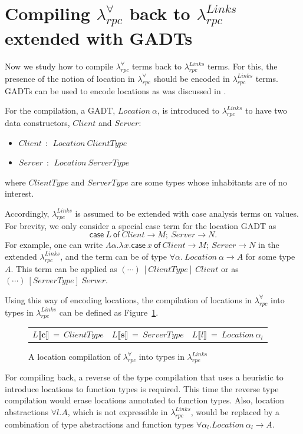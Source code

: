 \documentclass[a4paper]{article}
\theoremstyle{plain}
\theoremstyle{definition}
\newcommand{\polyrpc}{$\lambda_{rpc}^{\forall}$\xspace}
\newcommand{\linksrpc}{$\lambda_{rpc}^{Links}$\xspace}
\newcommand{\client}{\textbf{c}}
\newcommand{\server}{\textbf{s}}
\newcommand{\lamL}[3]{\lambda^{#1}#2.#3}
\newcommand{\textsfCase}{\textsf{case}}
\newcommand{\textsfOf}{\textsf{of}}
\newcommand{\case}[2]{\textsfCase ~ #1 ~\textsfOf ~ #2}
\newcommand{\loctycomp}[1]{L\llbracket#1\rrbracket}
\begin{document}
\section{Compiling {\polyrpc} back to {\linksrpc} extended with GADTs}
\label{sec:compilationwithgadts}


%
Now we study how to compile \polyrpc terms back to \linksrpc terms.
%
For this, the presence of the notion of location in \polyrpc should be
encoded in \linksrpc terms.
%
GADTs can be used to encode locations as was discussed in
\cite{CHOI:scp2020}.

%
For the compilation, a GADT, $Location \ \alpha$, is introduced to
\linksrpc to have two data constructors, $Client $ and $Server$:
\begin{itemize}
  \item $Client \ \ : \ \ Location \ ClientType$
  \item $Server \ \ : \ \ Location \ ServerType$
\end{itemize}
where $ClientType$ and $ServerType$ are some types whose
inhabitants are of no interest.

Accordingly, \linksrpc is assumed to be extended with case analysis
terms on values. For brevity, we only consider a special case term for
the location GADT as
\[
\case{L}{Client \rightarrow M; \ Server \rightarrow N}.
\]
%
For example, one can write $\Lambda\alpha.\lamL{}{x}{\case{x}{Client
    \rightarrow M; \ Server \rightarrow N}}$ in the
extended \linksrpc, and the term can be of type
$\forall\alpha. \ Location \ \alpha \rightarrow A$ for some type $A$.
%
This term can be applied as $(\cdots) \ [ClientType] \ Client$ or as
$(\cdots) \ [ServerType] \ Server$.

%
Using this way of encoding locations, the compilation of locations in
\polyrpc into types in \linksrpc can be defined as
Figure~\ref{fig:locationcompilationback}.

\begin{figure}[h]
\centering
\begin{tabular}{l l l }
$\loctycomp{\client} \ = \ ClientType$ &
$\loctycomp{\server} \ = \ ServerType$ &
$\loctycomp{l} \ = \ Location \ \alpha_l$
\\
\end{tabular}
\caption{A location compilation of \polyrpc into types in \linksrpc}
\label{fig:locationcompilationback}
\end{figure}


%
For compiling back, a reverse of the type compilation that uses a
heuristic to introduce locations to function types is required.
%
This time the reverse type compilation would erase locations annotated
to function types.
%
Also, location abstractions $\forall l. A$, which is not expressible in
\linksrpc, would be replaced by a combination of type abstractions and
function types $\forall\alpha_l. Location \ \alpha_l \rightarrow A$.
%
\end{document}
